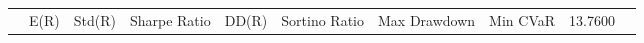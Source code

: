 \begin{tabular}{lrrrrrrrrr}
 & E(R) & Std(R) & Sharpe Ratio & DD(R) & Sortino Ratio & Max Drawdown & %
Min CVaR & 13.7600%
\end{tabular}
